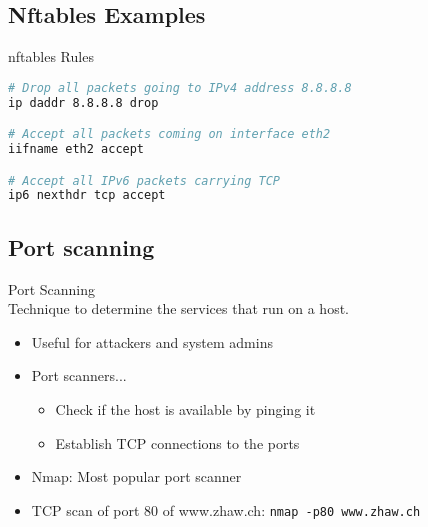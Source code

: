 \subsection{Nftables Examples}

\begin{examplecode}{nftables Rules}\\
\begin{lstlisting}[language=bash, style=basesmol]
# Drop all packets going to IPv4 address 8.8.8.8
ip daddr 8.8.8.8 drop

# Accept all packets coming on interface eth2
iifname eth2 accept

# Accept all IPv6 packets carrying TCP
ip6 nexthdr tcp accept
\end{lstlisting}
\end{examplecode}

\subsection{Port scanning}

\begin{definition}{Port Scanning}\\
    Technique to determine the services that run on a host.
    \begin{itemize}
        \item Useful for attackers and system admins
        \item Port scanners...
        \begin{itemize}
            \item Check if the host is available by pinging it
            \item Establish TCP connections to the ports
        \end{itemize}
        \item Nmap: Most popular port scanner
        \item TCP scan of port 80 of www.zhaw.ch: \texttt{nmap -p80 www.zhaw.ch}
    \end{itemize}
\end{definition}